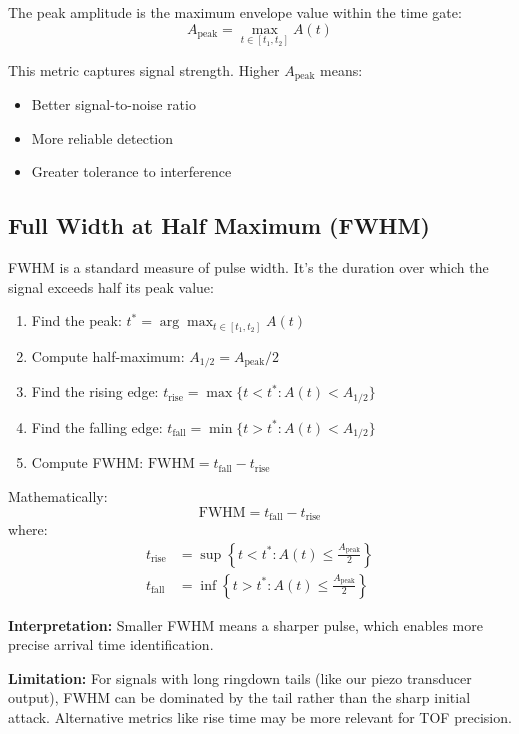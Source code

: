 \documentclass[11pt]{article}
\begin{document}
The peak amplitude is the maximum envelope value within the time gate:
\begin{equation}
    A_{\text{peak}} = \max_{t \in [t_1, t_2]} A(t)
\end{equation}

This metric captures signal strength. Higher $A_{\text{peak}}$ means:
\begin{itemize}
    \item Better signal-to-noise ratio
    \item More reliable detection
    \item Greater tolerance to interference
\end{itemize}

\subsection{Full Width at Half Maximum (FWHM)}

FWHM is a standard measure of pulse width. It's the duration over which the signal exceeds half its peak value:

\begin{enumerate}
    \item Find the peak: $t^* = \arg\max_{t \in [t_1, t_2]} A(t)$
    \item Compute half-maximum: $A_{1/2} = A_{\text{peak}} / 2$
    \item Find the rising edge: $t_{\text{rise}} = \max\{t < t^* : A(t) < A_{1/2}\}$
    \item Find the falling edge: $t_{\text{fall}} = \min\{t > t^* : A(t) < A_{1/2}\}$
    \item Compute FWHM: $\text{FWHM} = t_{\text{fall}} - t_{\text{rise}}$
\end{enumerate}

Mathematically:
\begin{equation}
    \text{FWHM} = t_{\text{fall}} - t_{\text{rise}}
\end{equation}
where:
\begin{align}
    t_{\text{rise}} &= \sup\left\{ t < t^* : A(t) \leq \frac{A_{\text{peak}}}{2} \right\} \\
    t_{\text{fall}} &= \inf\left\{ t > t^* : A(t) \leq \frac{A_{\text{peak}}}{2} \right\}
\end{align}

\textbf{Interpretation:} Smaller FWHM means a sharper pulse, which enables more precise arrival time identification.

\textbf{Limitation:} For signals with long ringdown tails (like our piezo transducer output), FWHM can be dominated by the tail rather than the sharp initial attack. Alternative metrics like rise time may be more relevant for TOF precision.
\end{document}
